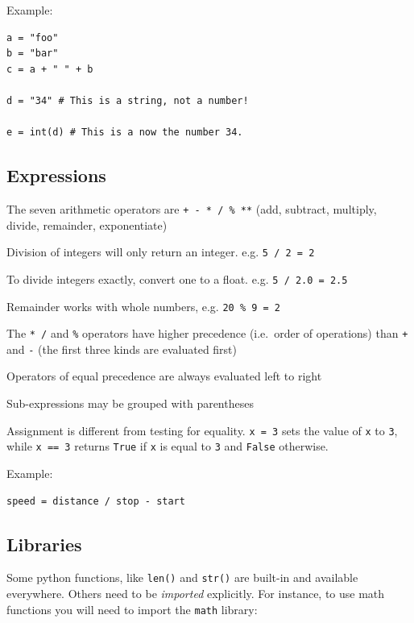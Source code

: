\documentclass[12pt,a4paper,twoside]{article}
\renewcommand{\_}{\texttt{\symbol{95}}}
\begin{document}
Example:
\begin{verbatim}
a = "foo"
b = "bar"
c = a + " " + b

d = "34" # This is a string, not a number!

e = int(d) # This is a now the number 34.
\end{verbatim}

\subsection{Expressions}

\begin{bulletlist}
\item The seven arithmetic operators are \verb^+ - * / % **^ (add,
	subtract, multiply, divide, remainder, exponentiate)
\item Division of integers will only return an integer. e.g. \verb^5 / 2 = 2^
\item To divide integers exactly, convert one to a float. e.g. \verb^5 / 2.0 = 2.5^
\item Remainder works with whole numbers, e.g. \verb^20 % 9 = 2^
\item The \verb^* /^ and \verb^%^ operators have higher precedence
                               (i.e.\ order of operations) than
	\verb^+^ and \verb^-^ (the first three kinds are evaluated first)

\item Operators of equal precedence are always evaluated left to right
\item Sub-expressions may be grouped with parentheses
\item Assignment is different from testing for equality. \verb^x = 3^ sets the value of \verb^x^ to \verb^3^, while \verb^x == 3^ returns \verb^True^ if \verb^x^ is equal to \verb^3^ and \verb^False^ otherwise.
\end{bulletlist}

Example:
\begin{verbatim}
speed = distance / stop - start
\end{verbatim}

\subsection{Libraries}
\label{subsec:libraries}
Some python functions, like \verb^len()^ and \verb^str()^ are built-in and available everywhere. Others need to be \textit{imported} explicitly. For instance, to use math functions you will need to import the \verb^math^ library:
\end{document}
